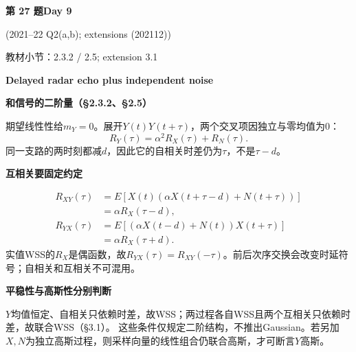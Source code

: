 \documentclass[10.5pt,fontset=fandol]{ctexart}
\newcommand{\key}[1]{\par\vspace{4pt}\noindent\textbf{\color{navy}#1}\par\vspace{2pt}}
\newcommand{\qtitle}[2]{\par\addvspace{1.2em}\Needspace{8\baselineskip}\begin{tcolorbox}[colback=navy,colframe=navy,arc=1.5pt,boxrule=0pt]\color{white}\large\bfseries #1\hfill\small #2\end{tcolorbox}}
\begin{document}
\qtitle{第 27 题}{Day 9}
{\small\color{accentred}(2021--22 Q2(a,b); extensions (202112))}\par\smallskip
{\small\color{muted}教材小节：2.3.2 / 2.5; extension 3.1}\par\medskip
\noindent\textbf{Delayed radar echo plus independent noise}\par\smallskip\begin{tcolorbox}[breakable,colback=qbg,colframe=qbg,boxrule=0pt]\key{和信号的二阶量（§2.3.2、§2.5）}
期望线性性给$m_Y=0$。展开$Y(t)Y(t+\tau)$，两个交叉项因独立与零均值为0：
\[\boxed{R_Y(\tau)=\alpha^2R_X(\tau)+R_N(\tau)}.\]
同一支路的两时刻都减$d$，因此它的自相关时差仍为$\tau$，不是$\tau-d$。
\key{互相关要固定约定}
\[\begin{aligned}R_{XY}(\tau)&=E[X(t)(\alpha X(t+\tau-d)+N(t+\tau))]\\&=\boxed{\alpha R_X(\tau-d)},\\
R_{YX}(\tau)&=E[(\alpha X(t-d)+N(t))X(t+\tau)]\\&=\boxed{\alpha R_X(\tau+d)}.\end{aligned}\]
实值WSS的$R_X$是偶函数，故$R_{YX}(\tau)=R_{XY}(-\tau)$。前后次序交换会改变时延符号；自相关和互相关不可混用。
\key{平稳性与高斯性分别判断}
$Y$均值恒定、自相关只依赖时差，故WSS；两过程各自WSS且两个互相关只依赖时差，故联合WSS（§3.1）。
这些条件仅规定二阶结构，不推出Gaussian。若另加$X,N$为独立高斯过程，则采样向量的线性组合仍联合高斯，才可断言$Y$高斯。
\end{tcolorbox}
\end{document}
